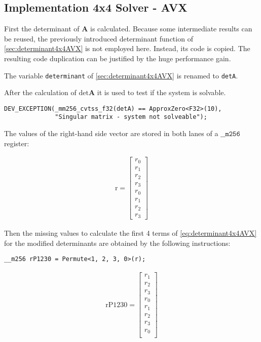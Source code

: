 \newpage
\subsection{Implementation 4x4 Solver - AVX}

First the determinant of $\mathbf{A}$ is calculated.
Because some intermediate results can be reused, the previously introduced determinant function of \cref{sec:determinant4x4AVX} is not employed here. 
Instead, its code is copied. 
The resulting code duplication can be justified by the huge performance gain.

The variable \texttt{determinant} of \cref{sec:determinant4x4AVX} is renamed to \texttt{detA}.

After the calculation of $\mathrm{det}\mathbf{A}$ it is used to test if the system is solvable.

\begin{verbatim}
DEV_EXCEPTION(_mm256_cvtss_f32(detA) == ApproxZero<F32>(10), 
              "Singular matrix - system not solveable");
\end{verbatim} 

The values of the right-hand side vector are stored in both lanes of a $\texttt{__m256}$ register:


\begin{align*}
\mathrm{r} 
=
\begin{bmatrix}
r_0\\
r_1\\
r_2\\
r_3\\
r_0\\
r_1\\
r_2\\
r_3
\end{bmatrix}
\end{align*}


Then the missing values to calculate the first 4 terms of \cref{eq:determinant4x4AVX} for the modified determinants are obtained by the following instructions:

\begin{verbatim}
__m256 rP1230 = Permute<1, 2, 3, 0>(r);
\end{verbatim} 

\begin{align*}
\mathrm{rP1230} 
=
\begin{bmatrix}
r_1\\
r_2\\
r_3\\
r_0\\
r_1\\
r_2\\
r_3\\
r_0\\
\end{bmatrix}
\end{align*}


